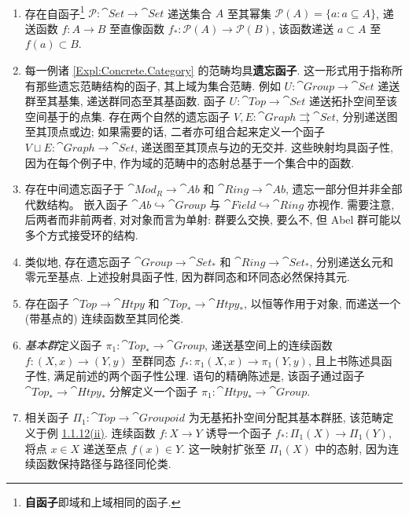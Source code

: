 \begin{example}
    \ \begin{enumerate}[label=(\roman*)]
        \item 存在自函子\footnote{\textbf{自函子}即域和上域相同的函子.} \(\mathscr P\colon\cat{Set}\to\cat{Set}\) 递送集合 \(A\) 至其幂集 \(\mathscr P(A)=\{a\colon a\subseteq A\}\), 递送函数 \(f\colon A\to B\) 至直像函数 \(f_*\colon\mathscr P(A)\to\mathscr P(B)\), 该函数递送 \(a\subset A\) 至 \(f(a)\subset B\).
        \item 每一例诸 \ref{Expl:Concrete.Category} 的范畴均具\textbf{遗忘函子}. 这一形式用于指称所有那些遗忘范畴结构的函子, 其上域为集合范畴. 例如 \(U\colon\cat{Group}\to\cat{Set}\) 递送群至其基集, 递送群同态至其基函数. 函子 \(U\colon\cat{Top}\to\cat{Set}\) 递送拓扑空间至该空间基于的点集. 存在两个自然的遗忘函子 \(V,E\colon\cat{Graph}\rightrightarrows\cat{Set}\), 分别递送图至其顶点或边; 如果需要的话, 二者亦可组合起来定义一个函子 \(V\sqcup E\colon\cat{Graph}\to\cat{Set}\), 递送图至其顶点与边的无交并. 这些映射均具函子性, 因为在每个例子中, 作为域的范畴中的态射总基于一个集合中的函数.
        \item 存在中间遗忘函子于 \(\cat{Mod}_R\to\cat{Ab}\) 和 \(\cat{Ring}\to\cat{Ab}\), 遗忘一部分但并非全部代数结构。 嵌入函子 \(\cat{Ab}\hookrightarrow\cat{Group}\) 与 \(\cat{Field}\hookrightarrow\cat{Ring}\) 亦视作. 需要注意, 后两者而非前两者, 对对象而言为单射: 群要么交换, 要么不, 但 Abel 群可能以多个方式接受环的结构.
        \item 类似地, 存在遗忘函子 \(\cat{Group}\to\cat{Set}_*\) 和 \(\cat{Ring}\to\cat{Set}_*\), 分别递送幺元和零元至基点. 上述投射具函子性, 因为群同态和环同态必然保持其元.
        \item 存在函子 \(\cat{Top}\to\cat{Htpy}\) 和 \(\cat{Top}_*\to\cat{Htpy}_*\), 以恒等作用于对象, 而递送一个 (带基点的) 连续函数至其同伦类.
        \item \textit{基本群}定义函子 \(\pi_1\colon\cat{Top}_*\to\cat{Group}\), 递送基空间上的连续函数 \(f\colon (X,x)\to(Y,y)\) 至群同态 \(f_*\colon\pi_1(X,x)\to\pi_1(Y,y)\), 且上书陈述具函子性, 满足前述的两个函子性公理. 语句的精确陈述是, 该函子通过函子 \(\cat{Top}_*\to\cat{Htpy}_*\) 分解定义一个函子 \(\pi_1\colon\cat{Htpy}_*\to\cat{Group}\).
        \item 相关函子 \(\Pi_1\colon\cat{Top}\to\cat{Groupoid}\) 为无基拓扑空间分配其基本群胚, 该范畴定义于例 \href{Expl:Fundamental.Groupoid.FOR.Topological.Space}{1.1.12(ii)}. 连续函数 \(f\colon X\to Y\) 诱导一个函子 \(f_*\colon\Pi_1(X)\to \Pi_1(Y)\), 将点 \(x\in X\) 递送至点 \(f(x)\in Y\). 这一映射扩张至 \(\Pi_1(X)\) 中的态射, 因为连续函数保持路径与路径同伦类.

\end{enumerate}
\end{example}
